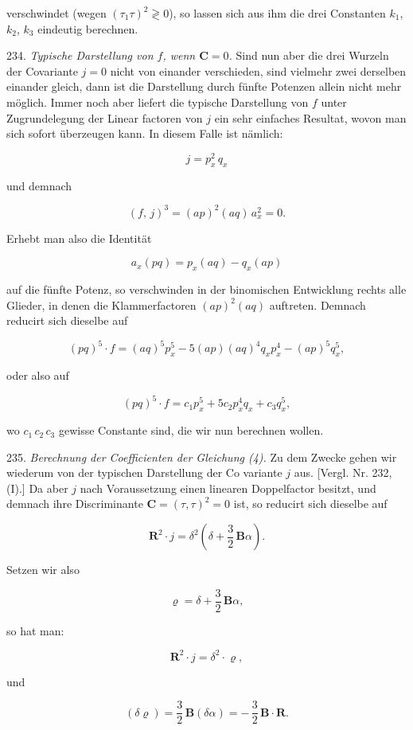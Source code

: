 \documentclass[11pt]{article}
\providecommand{\weberpage}[1]{}
\providecommand{\weq}[2]{\begin{equation}\tag{#1}#2\end{equation}}
\begin{document}
\weberpage{258}
verschwindet (wegen $(\tau_1\tau)^2 \gtrless 0$), so lassen sich aus ihm die drei
Constanten $k_1$, $k_2$, $k_3$ eindeutig berechnen.

234. \textit{Typische Darstellung von $f$, wenn $\mathbf{C} = 0$.} Sind nun aber die
drei Wurzeln der Covariante $j = 0$ nicht von einander verschieden,
sind vielmehr zwei derselben einander gleich, dann ist die Darstellung
durch fünfte Potenzen allein nicht mehr möglich. Immer noch aber
liefert die typische Darstellung von $f$ unter Zugrundelegung der Linear\-
factoren von $j$ ein sehr einfaches Resultat, wovon man sich sofort
überzeugen kann. In diesem Falle ist nämlich:

\weq{1}{
j = p_x^2\,q_x
}

und demnach

\weq{2}{
(f,\,j)^3 = (ap)^2(aq)\,a_x^2 = 0.
}

Erhebt man also die Identität

\[
a_x(pq) = p_x(aq) - q_x(ap)
\]

auf die fünfte Potenz, so verschwinden in der binomischen Entwicklung
rechts alle Glieder, in denen die Klammerfactoren $(ap)^2(aq)$ auftreten.
Demnach reducirt sich dieselbe auf

\weq{3}{
(pq)^5\cdot f = (aq)^5p_x^5 - 5(ap)(aq)^4q_xp_x^4 - (ap)^5q_x^5,
}

oder also auf

\weq{4}{
(pq)^5\cdot f = c_1p_x^5 + 5c_2p_x^4q_x + c_3q_x^5,
}

wo $c_1\,c_2\,c_3$ gewisse Constante sind, die wir nun berechnen wollen.

235. \textit{Berechnung der Coefficienten der Gleichung (4).} Zu dem
Zwecke gehen wir wiederum von der typischen Darstellung der Co\-
variante $j$ aus. [Vergl. Nr. 232, (I).] Da aber $j$ nach Voraussetzung
einen linearen Doppelfactor besitzt, und demnach ihre Discriminante
$\mathbf{C} = (\tau,\tau)^2 = 0$ ist, so reducirt sich dieselbe auf

\[
\mathbf{R}^2\cdot j = \delta^2\left(\delta + \frac32\,\mathbf{B}\alpha\right).
\]

Setzen wir also

\weq{5}{
\varrho = \delta + \frac32\,\mathbf{B}\alpha,
}

so hat man:

\weq{5a}{
\mathbf{R}^2\cdot j = \delta^2\cdot\varrho,
}

und

\weq{5b}{
(\delta\varrho) = \frac32\,\mathbf{B}(\delta\alpha) = -\,\frac32\,\mathbf{B}\cdot\mathbf{R}.
}
\end{document}
